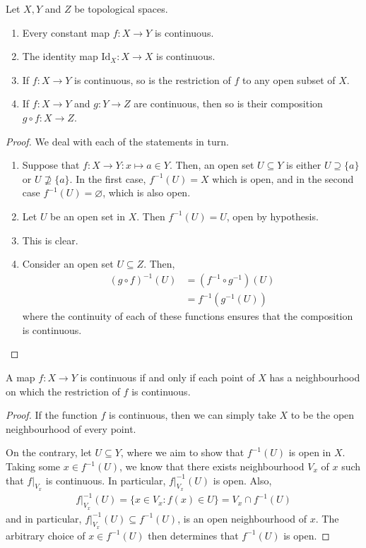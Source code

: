 \begin{proposition}
	Let $ X, Y $ and $ Z $ be topological spaces.
	\begin{enumerate}
		\item Every constant map $ f:X \to Y $ is continuous.
		\item The identity map $ \mathrm{Id}_{X}:X \to X $ is continuous.
		\item If $ f:X \to Y $ is continuous, so is the restriction of $ f $ to any open subset of $ X $.
		\item If $ f:X \to Y $ and $ g: Y \to Z $ are continuous, then so is their composition $ g \circ f: X \to Z $.
	\end{enumerate}
	\begin{proof}
		We deal with each of the statements in turn.
		\begin{enumerate}
			\item Suppose that $ f:X \to Y: x \mapsto a \in Y $. Then, an open set $ U \subseteq Y $ is either $ U \supseteq \{ a \} $ or $ U \not \supseteq \{ a \} $. In the first case, $ f ^{-1}( U ) = X $ which is open, and in the second case $ f ^{-1}( U ) = \varnothing $, which is also open.
			\item Let $ U $ be an open set in $ X $. Then $ f ^{-1}( U ) = U $, open by hypothesis.
			\item This is clear.
			\item Consider an open set $ U \subseteq Z $. Then,
			      \begin{align*}
				      ( g \circ f )^{-1}( U ) & = (f ^{-1}\circ g ^{-1})( U ) \\
				                              & = f ^{-1}( g ^{-1}( U ) )
			      \end{align*}
			      where the continuity of each of these functions ensures that the composition is continuous.
		\end{enumerate}
	\end{proof}
\end{proposition}

\begin{proposition}
	A map $ f:X \to Y $ is continuous if and only if each point of $ X $ has a neighbourhood on which the restriction of $ f $ is continuous.
	\begin{proof}
		If the function $ f $ is continuous, then we can simply take $ X $ to be the open neighbourhood of every point.

		On the contrary, let $ U \subseteq Y $, where we aim to show that $ f ^{-1}( U ) $ is open in $ X $. Taking some $ x \in f ^{-1}( U ) $, we know that there exists neighbourhood $ V_{x} $ of $ x $ such that $ f |_{V_{x}} $ is continuous. In particular, $ f|_{V_{x}}^{-1}( U ) $ is open. Also,
		\begin{align*}
			f|_{V_{x}}^{-1}( U ) = \{ x \in V_{x}: f ( x ) \in U \} = V_{x} \cap f ^{-1}( U )
		\end{align*}
		and in particular, $ f|_{V_{x}}^{-1}( U )\subseteq f ^{-1}( U ) $, is an open neighbourhood of $ x $. The arbitrary choice of $ x \in f ^{-1}( U ) $ then determines that $ f ^{-1}( U ) $ is open.
	\end{proof}
\end{proposition}

